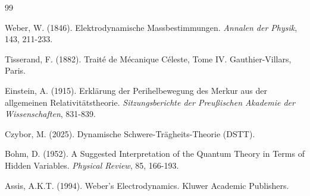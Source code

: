 \documentclass[12pt,a4paper]{article}
\begin{document}
\begin{thebibliography}{99}

Weber, W. (1846). Elektrodynamische Massbestimmungen. \textit{Annalen der Physik}, 143, 211-233.

Tisserand, F. (1882). Traité de Mécanique Céleste, Tome IV. Gauthier-Villars, Paris.

Einstein, A. (1915). Erklärung der Perihelbewegung des Merkur aus der allgemeinen Relativitätstheorie. \textit{Sitzungsberichte der Preußischen Akademie der Wissenschaften}, 831-839.

Czybor, M. (2025). Dynamische Schwere-Trägheits-Theorie (DSTT).

Bohm, D. (1952). A Suggested Interpretation of the Quantum Theory in Terms of Hidden Variables. \textit{Physical Review}, 85, 166-193.

Assis, A.K.T. (1994). Weber's Electrodynamics. Kluwer Academic Publishers.

\end{thebibliography}
\end{document}
